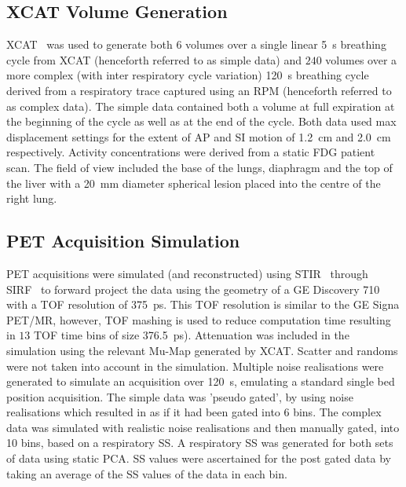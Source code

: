 \documentclass[10pt, twocolumn, twoside, letterpaper]{IEEEtran}
\begin{document}
    \subsection{XCAT Volume Generation} \label{sec:xcat_volume_generation}
        \gls{XCAT}~\cite{Segars2010} was used to generate both $6$ volumes over a single linear \SI{5}{\second} breathing cycle from \gls{XCAT} (henceforth referred to as simple data) and $240$ volumes over a more complex (with inter respiratory cycle variation) \SI{120}{\second} breathing cycle derived from a respiratory trace captured using an \gls{RPM} (henceforth referred to as complex data). The simple data contained both a volume at full expiration at the beginning of the cycle as well as at the end of the cycle. Both data used max displacement settings for the extent of \gls{AP} and \gls{SI} motion of \SI{1.2}{\centi\metre} and \SI{2.0}{\centi\metre} respectively. Activity concentrations were derived from a static \gls{FDG} patient scan. The field of view included the base of the lungs, diaphragm and the top of the liver with a \SI{20}{\milli\metre} diameter spherical lesion placed into the centre of the right lung.
    
    \subsection{PET Acquisition Simulation} \label{sec:pet_acquisition_simulation}
        \gls{PET} acquisitions were simulated (and reconstructed) using \gls{STIR}~\cite{Thielemans2012, Efthimiou2018} through \gls{SIRF}~\cite{Ovtchinnikov2017, Ovtchinnikov2019CCPPETMRSIRF} to forward project the data using the geometry of a \gls{GE} Discovery 710 with a \gls{TOF} resolution of \SI{375}{\pico\second}. This \gls{TOF} resolution is similar to the \gls{GE} Signa \gls{PET}/\gls{MR}, however, \gls{TOF} mashing is used to reduce computation time resulting in $13$ \gls{TOF} time bins of size \SI{376.5}{\pico\second}). Attenuation was included in the simulation using the relevant \gls{Mu-Map} generated by \gls{XCAT}. Scatter and randoms were not taken into account in the simulation. Multiple noise realisations were generated to simulate an acquisition over \SI{120}{\second}, emulating a standard single bed position acquisition. The simple data was 'pseudo gated', by using noise realisations which resulted in as if it had been gated into $6$ bins. The complex data was simulated with realistic noise realisations and then manually gated, into 10 bins, based on a respiratory \gls{SS}. A respiratory \gls{SS} was generated for both sets of data using static \gls{PCA}. \gls{SS} values were ascertained for the post gated data by taking an average of the \gls{SS} values of the data in each bin.
    
\end{document}
